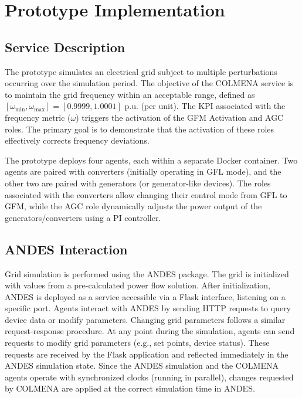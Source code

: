 \documentclass{article}
\begin{document}
\section{Prototype Implementation}

\subsection*{Service Description}

The prototype simulates an electrical grid subject to multiple perturbations occurring over the simulation period. The objective of the COLMENA service is to maintain the grid frequency within an acceptable range, defined as $[\omega_{\min}, \omega_{\max}] = [0.9999, 1.0001]$ p.u. (per unit). The KPI associated with the frequency metric ($\omega$) triggers the activation of the GFM Activation and AGC roles. The primary goal is to demonstrate that the activation of these roles effectively corrects frequency deviations.

The prototype deploys four agents, each within a separate Docker container. Two agents are paired with converters (initially operating in GFL mode), and the other two are paired with generators (or generator-like devices). The roles associated with the converters allow changing their control mode from GFL to GFM, while the AGC role dynamically adjusts the power output of the generators/converters using a PI controller.

\subsection{ANDES Interaction}

Grid simulation is performed using the ANDES package. The grid is initialized with values from a pre-calculated power flow solution. After initialization, ANDES is deployed as a service accessible via a Flask interface, listening on a specific port. Agents interact with ANDES by sending HTTP requests to query device data or modify parameters. Changing grid parameters follows a similar request-response procedure. At any point during the simulation, agents can send requests to modify grid parameters (e.g., set points, device status). These requests are received by the Flask application and reflected immediately in the ANDES simulation state. Since the ANDES simulation and the COLMENA agents operate with synchronized clocks (running in parallel), changes requested by COLMENA are applied at the correct simulation time in ANDES.
\end{document}
